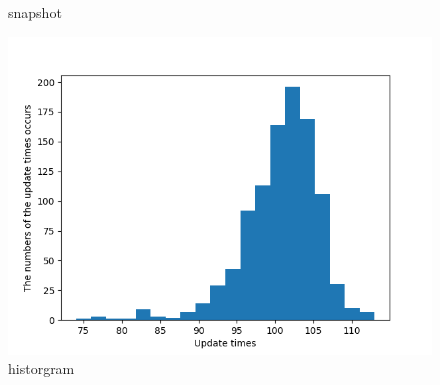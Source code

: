 \documentclass[12pt,a4paper]{article}
\begin{document}
\begin{figure}[hbp]
\begin{minipage}{0.48\linewidth}
        \caption{snapshot}
    \end{minipage}\hfil
    \begin{minipage}{0.48\linewidth}
        \centering
        \includegraphics[width = \linewidth]{Hw1P12.png}
        \caption{historgram}
    \end{minipage}\hfil
\end{figure}
\end{document}
